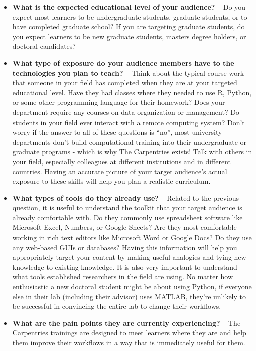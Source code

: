 \documentclass[
]{book}
\begin{document}
\begin{itemize}
\item
  \textbf{What is the expected educational level of your audience?} -- Do you expect most learners to be undergraduate students, graduate students, or to have completed graduate school?
  If you are targeting graduate students,
  do you expect learners to be new graduate students,
  masters degree holders, or doctoral candidates?
\item
  \textbf{What type of exposure do your audience members have to the technologies you
  plan to teach?} -- Think about the typical course work that someone in your field
  has completed when they are at your targeted educational level. Have they had
  classes where they needed to use R, Python, or some other programming language
  for their homework? Does your department require any courses on data
  organization or management? Do students in your field ever interact with a
  remote computing system? Don't worry if the answer to all of these questions is
  ``no'', most university departments don't build computational training into their
  undergraduate or graduate programs - which is why The Carpentries exists! Talk
  with others in your field, especially colleagues at different institutions and
  in different countries. Having an accurate picture of your target audience's
  actual exposure to these skills will help you plan a realistic curriculum.
\item
  \textbf{What types of tools do they already use?} -- Related to the previous question, it is useful to understand
  the toolkit that your target audience is already comfortable with. Do they commonly use spreadsheet software
  like Microsoft Excel, Numbers, or Google Sheets? Are they most comfortable working in rich text editors like
  Microsoft Word or Google Docs? Do they use any web-based GUIs or databases? Having this information will help you
  appropriately target your content by making useful analogies and tying new knowledge to existing knowledge. It
  is also very important to understand what tools established researchers in the field are using. No matter how
  enthusiastic a new doctoral student might be about using Python, if everyone else in their lab (including
  their advisor) uses MATLAB, they're unlikely to be successful in convincing the entire lab to change their
  workflows.
\item
  \textbf{What are the pain points they are currently experiencing?} -- The Carpentries trainings are designed to
  meet learners where they are and help them improve their workflows in a way that is immediately useful for them.

\end{itemize}
\end{document}
